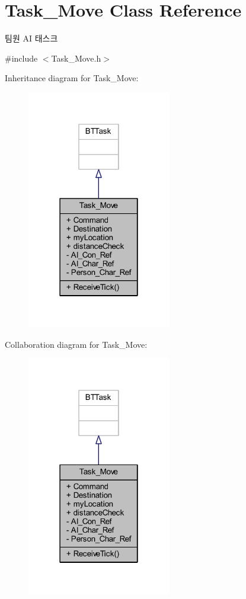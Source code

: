 \hypertarget{class_task___move}{}\section{Task\+\_\+\+Move Class Reference}
\label{class_task___move}


팀원 AI 태스크  




{\ttfamily \#include $<$Task\+\_\+\+Move.\+h$>$}



Inheritance diagram for Task\+\_\+\+Move\+:\nopagebreak
\begin{figure}[H]
\begin{center}
\leavevmode
\includegraphics[width=178pt]{class_task___move__inherit__graph}
\end{center}
\end{figure}


Collaboration diagram for Task\+\_\+\+Move\+:\nopagebreak
\begin{figure}[H]
\begin{center}
\leavevmode
\includegraphics[width=178pt]{class_task___move__coll__graph}
\end{center}
\end{figure}
